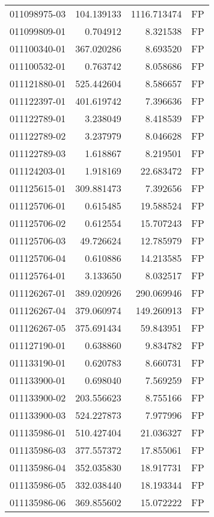 \begin{tabular}{lrrl}
011098975-03 &  104.139133 &  1116.713474 &   FP \\
011099809-01 &    0.704912 &     8.321538 &   FP \\
011100340-01 &  367.020286 &     8.693520 &   FP \\
011100532-01 &    0.763742 &     8.058686 &   FP \\
011121880-01 &  525.442604 &     8.586657 &   FP \\
011122397-01 &  401.619742 &     7.396636 &   FP \\
011122789-01 &    3.238049 &     8.418539 &   FP \\
011122789-02 &    3.237979 &     8.046628 &   FP \\
011122789-03 &    1.618867 &     8.219501 &   FP \\
011124203-01 &    1.918169 &    22.683472 &   FP \\
011125615-01 &  309.881473 &     7.392656 &   FP \\
011125706-01 &    0.615485 &    19.588524 &   FP \\
011125706-02 &    0.612554 &    15.707243 &   FP \\
011125706-03 &   49.726624 &    12.785979 &   FP \\
011125706-04 &    0.610886 &    14.213585 &   FP \\
011125764-01 &    3.133650 &     8.032517 &   FP \\
011126267-01 &  389.020926 &   290.069946 &   FP \\
011126267-04 &  379.060974 &   149.260913 &   FP \\
011126267-05 &  375.691434 &    59.843951 &   FP \\
011127190-01 &    0.638860 &     9.834782 &   FP \\
011133190-01 &    0.620783 &     8.660731 &   FP \\
011133900-01 &    0.698040 &     7.569259 &   FP \\
011133900-02 &  203.556623 &     8.755166 &   FP \\
011133900-03 &  524.227873 &     7.977996 &   FP \\
011135986-01 &  510.427404 &    21.036327 &   FP \\
011135986-03 &  377.557372 &    17.855061 &   FP \\
011135986-04 &  352.035830 &    18.917731 &   FP \\
011135986-05 &  332.038440 &    18.193344 &   FP \\
011135986-06 &  369.855602 &    15.072222 &   FP \\

\end{tabular}
